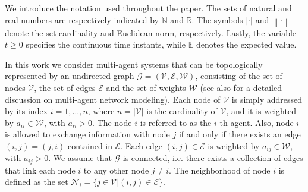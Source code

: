 \documentclass{ifac/ifacconf}
\newcommand{\mfa}[1]{\textcolor{red}{#1}}
\begin{document}
 We introduce the notation used throughout the paper.
The sets of natural and real numbers are respectively indicated by $\mathbb{N}$ and $\mathbb{R}$. 
The symbols $|\cdot|$ and $\left\|\cdot \right\|$ denote the set cardinality and Euclidean norm, respectively. %
Lastly, the variable $t\geq 0$ specifies the continuous time instants, while $\mathbb{E}$ denotes the expected value. %

In this work we consider multi-agent systems that can be topologically represented by an undirected graph $\mathcal{G} = (\mathcal{V},\mathcal{E},\mathcal{W})$, consisting of the set of nodes $\mathcal{V}$, the set of edges $\mathcal{E}$ and the set of weights $\mathcal{W}$ (see also \cite{mesbahi2010graph} for a detailed discussion on multi-agent network modeling). Each node of $\mathcal{V}$ is simply addressed by its index $i = 1,\ldots,n$, where $n = |\mathcal{V}|$ is the cardinality of $\mathcal{V}$, and it is weighted by $a_{ii} \in \mathcal{W}$, with $a_{ii}> 0$. The node $i$ is referred to as the $i$-th agent. Also, node $i$ is allowed to exchange information with node $j$ if and only if there exists an edge $(i,j)=(j,i)$ contained in $\mathcal{E}$. Each edge $(i,j)\in \mathcal{E}$ is weighted by $a_{ij} \in \mathcal{W}$, with $a_{ij}>0$.
%
We assume that $\mathcal{G}$ is connected, i.e. there exists a collection of edges that link each node $i$ to any other node $j \neq i$. The neighborhood of node $i$ is defined as the set $\mathcal{N}_{i} = \{j\in \mathcal{V}|(i,j)\in \mathcal{E}\}$. 
\end{document}
